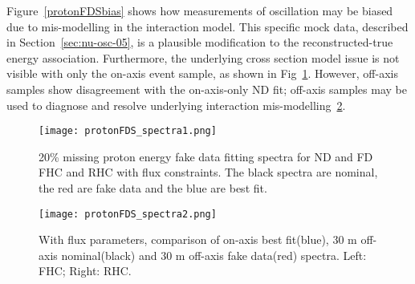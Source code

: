 Figure~\ref{protonFDSbias} shows how measurements of oscillation may be biased due to mis-modelling in the interaction model. This specific mock data, described in Section~\ref{sec:nu-osc-05}, is a plausible modification to the reconstructed-true energy association. Furthermore, the underlying cross section model issue is not visible with only the on-axis event sample, as shown in Fig~\ref{fig:protonFDS_spectra1}. However, off-axis samples show disagreement with the on-axis-only ND fit; off-axis samples may be used to diagnose and resolve underlying interaction mis-modelling~\ref{fig:protonFDS_spectra2}. %


\begin{figure}[h]
\centering
\texttt{[image: protonFDS\_spectra1.png]}
\caption{20\% missing proton energy fake data fitting spectra for ND and FD FHC and RHC with flux constraints. The black spectra are nominal, the red are fake data and the blue are best fit.}
\label{fig:protonFDS_spectra1}
\end{figure}

\begin{figure}[h]
\centering
\texttt{[image: protonFDS\_spectra2.png]}
\caption{With flux parameters, comparison of on-axis best fit(blue), 30 m off-axis nominal(black) and 30 m off-axis fake data(red) spectra. Left: FHC; Right: RHC. }
\label{fig:protonFDS_spectra2}
\end{figure}
